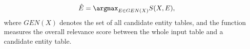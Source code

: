 \begin{equation}
  \label{eqn:joint-score}
  \hat{E} = \argmax_{E \in GEN(X)} S(X,E),
\end{equation}
\noindent
where $GEN(X)$ denotes the set of all candidate entity tables,
and the function measures the overall relevance score
between the whole input table and a candidate entity table.
%
%
%
%

%
% 
%
